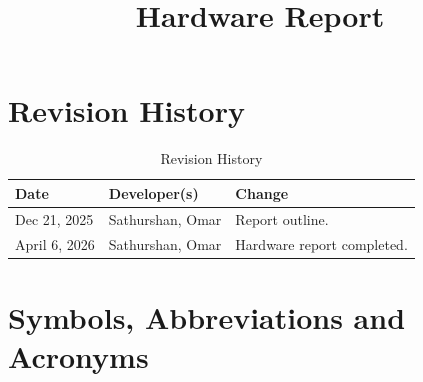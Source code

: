 \documentclass[12pt, titlepage]{article}
\begin{document}
\title{Hardware Report\\\progname}

\author{\authname}

\date{}

\maketitle


\newpage
\section{Revision History}

\begin{table}[hp]
\caption{Revision History} \label{TblRevisionHistory}
\begin{tabularx}{\textwidth}{llX}
\toprule
\textbf{Date} & \textbf{Developer(s)} & \textbf{Change}\\
\midrule
Dec 21, 2025 & Sathurshan, Omar & Report outline.\\
April 6, 2026 & Sathurshan, Omar & Hardware report completed.\\
\bottomrule
\end{tabularx}
\end{table}

\setlength{\parindent}{0pt}

\newpage

\section{Symbols, Abbreviations and Acronyms}
\end{document}
